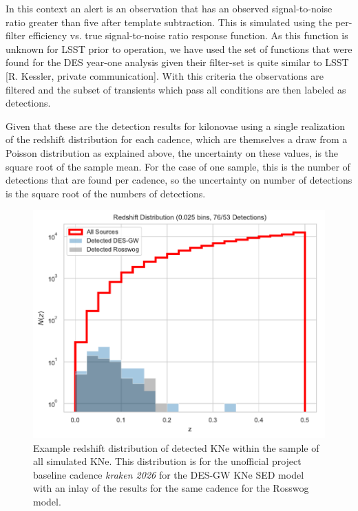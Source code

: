 In this context an alert is an observation that has an observed signal-to-noise ratio greater than five after template subtraction. This is simulated using the per-filter efficiency vs. true signal-to-noise ratio response function. As this function is unknown for LSST prior to operation, we have used the set of functions that were found for the DES year-one analysis given their filter-set is quite similar to LSST [R. Kessler, private communication]. With this criteria the observations are filtered and the subset of transients which pass all conditions are then labeled as detections.\par
Given that these are the detection results for kilonovae using a single realization of the redshift distribution for each cadence, which are themselves a draw from a Poisson distribution as explained above, the uncertainty on these values, is the square root of the sample mean. For the case of one sample, this is the number of detections that are found per cadence, so the uncertainty on number of detections is the square root of the numbers of detections.\par
\begin{figure}[h!]
  \centering
  \includegraphics[scale=0.72]{figures/both_nz_base_kraken_2026}
  \caption{Example redshift distribution of detected KNe within the sample of all simulated KNe. This distribution is for the unofficial project baseline cadence \protect \textit{kraken 2026} for the DES-GW KNe SED model with an inlay of the results for the same cadence for the Rosswog model.}
  \label{fig:typical_nz}
\end{figure}
